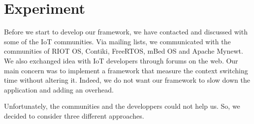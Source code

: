 \chapter{Experiment \label{chap:experiment}}

Before we start to develop our framework, we have contacted and discussed with some of the IoT communities.
Via mailing lists, we communicated with the communities of RIOT OS, Contiki, FreeRTOS, mBed OS and Apache Mynewt.
We also exchanged idea with IoT developers through forums on the web.
Our main concern was to implement a framework that measure the context switching time without altering it.
Indeed, we do not want our framework to slow down the application and adding an overhead.

Unfortunately, the communities and the developpers could not help us.
So, we decided to consider three different approaches.



